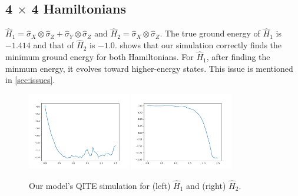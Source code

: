 \documentclass{article}
\begin{document}
\subsection{4 $\times$ 4 Hamiltonians}
$\hat{H}_1 = \hat{\sigma}_X \otimes \hat{\sigma}_Z + \hat{\sigma}_Y \otimes \hat{\sigma}_Z$ and $\hat{H}_2 = \hat{\sigma}_X \otimes \hat{\sigma}_Z$.
The true ground energy of $\hat{H}_1$ is $-1.414$ and that of $\hat{H}_2$ is $-1.0$.
 shows that our simulation correctly finds the minimum ground energy for both Hamiltonians.
For $\hat{H}_1$, after finding the minmum energy, it evolves toward higher-energy states.
This issue is mentioned in \cref{sec:issues}.
\begin{figure}
    \centering
    \includegraphics[width=0.4\textwidth]{4x4_ex1.png}
    \includegraphics[width=0.4\textwidth]{4x4_ex2.png}
    \caption{Our model's QITE simulation for (left) $\hat{H}_1$ and (right) $\hat{H}_2$.}
    \label{fig:4x4}
\end{figure}

\end{document}
